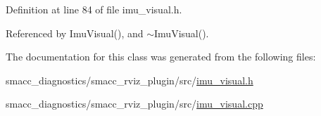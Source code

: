 Definition at line 84 of file imu\+\_\+visual.\+h.



Referenced by Imu\+Visual(), and $\sim$\+Imu\+Visual().



The documentation for this class was generated from the following files\+:\begin{DoxyCompactItemize}
\item 
smacc\+\_\+diagnostics/smacc\+\_\+rviz\+\_\+plugin/src/\hyperlink{imu__visual_8h}{imu\+\_\+visual.\+h}\item 
smacc\+\_\+diagnostics/smacc\+\_\+rviz\+\_\+plugin/src/\hyperlink{imu__visual_8cpp}{imu\+\_\+visual.\+cpp}\end{DoxyCompactItemize}
